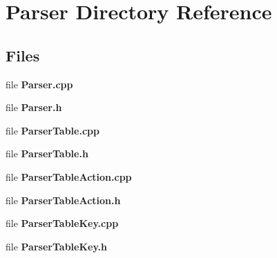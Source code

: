 \section{Parser Directory Reference}
\label{dir_df9c4130e7601915b63fc941466b92f8}
\subsection*{Files}
\begin{DoxyCompactItemize}
\item 
file {\bf Parser.\-cpp}
\item 
file {\bf Parser.\-h}
\item 
file {\bf Parser\-Table.\-cpp}
\item 
file {\bf Parser\-Table.\-h}
\item 
file {\bf Parser\-Table\-Action.\-cpp}
\item 
file {\bf Parser\-Table\-Action.\-h}
\item 
file {\bf Parser\-Table\-Key.\-cpp}
\item 
file {\bf Parser\-Table\-Key.\-h}
\end{DoxyCompactItemize}
